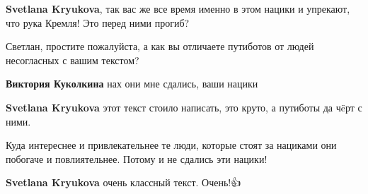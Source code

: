 \begin{itemize}
\begin{itemize}
 
\textbf{Svetlana Kryukova}, так вас же все время именно в этом нацики и упрекают, что рука Кремля! Это перед ними прогиб?

 
Светлан, простите пожалуйста, а как вы отличаете путиботов от людей несогласных с вашим текстом? \Smiley[1.0][yellow]


 
\textbf{Виктория Куколкина} нах они мне сдались, ваши нацики

 
\textbf{Svetlana Kryukova} этот текст стоило написать, это круто, а путиботы да чëрт с ними.

 

Куда интереснее и привлекательнее те люди, которые стоят за нациками они
побогаче и повлиятельнее. Потому и не сдались эти нацики! \Smiley[1.0][yellow]

 

\textbf{Svetlana Kryukova} очень классный текст. Очень!👍

 

\end{itemize}
\end{itemize}
